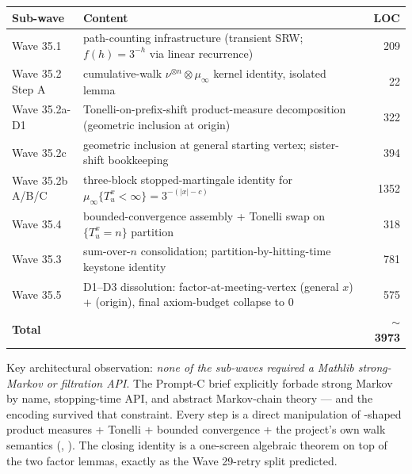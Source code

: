 \documentclass[11pt,a4paper]{article}
\theoremstyle{plain}
\theoremstyle{definition}
\begin{document}
\begin{center}
\renewcommand{\arraystretch}{1.15}
\begin{tabular}{llr}
\toprule
\textbf{Sub-wave} & \textbf{Content} & \textbf{LOC} \\
\midrule
Wave 35.1            & path-counting infrastructure (transient SRW; $f(h) = 3^{-h}$ via linear recurrence)                         & 209 \\
Wave 35.2 Step A     & cumulative-walk $\nu^{\otimes n} \otimes \mu_\infty$ kernel identity, isolated lemma                       & 22 \\
Wave 35.2a-D1        & Tonelli-on-prefix-shift product-measure decomposition (geometric inclusion at origin)                      & 322 \\
Wave 35.2c           & geometric inclusion at general starting vertex; sister-shift bookkeeping                                   & 394 \\
Wave 35.2b A/B/C     & three-block stopped-martingale identity for $\mu_\infty\{T_u^x < \infty\} = 3^{-(|x|-c)}$                  & 1352 \\
Wave 35.4            & bounded-convergence assembly + Tonelli swap on $\{T_u^x = n\}$ partition                                   & 318 \\
Wave 35.3            & sum-over-$n$ consolidation; partition-by-hitting-time keystone identity                                    & 781 \\
Wave 35.5            & D1--D3 dissolution: factor-at-meeting-vertex (general $x$) + (origin), final axiom-budget collapse to 0    & 575 \\
\midrule
\textbf{Total}       &                                                                                                           & \textbf{$\sim$3973} \\
\bottomrule
\end{tabular}
\end{center}

Key architectural observation: \emph{none of the sub-waves required
a Mathlib strong-Markov or filtration API}. The Prompt-C brief
explicitly forbade strong Markov by name, stopping-time API, and
abstract Markov-chain theory --- and the encoding survived that
constraint. Every step is a direct manipulation of
-shaped product measures + Tonelli +
bounded convergence + the project's own walk semantics
(, ). The closing
 identity
is a one-screen algebraic theorem on top of the two factor lemmas,
exactly as the Wave 29-retry split predicted.
\end{document}
